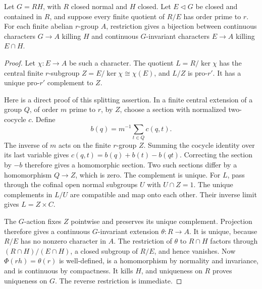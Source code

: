\begin{lemma}
\label{lem:coprime-relative-general}
Let \(G=RH\), with \(R\) closed normal and \(H\) closed.
Let \(E\triangleleft G\) be closed and contained in \(R\), and
suppose every finite quotient of \(R/E\) has order prime to \(r\).
For each finite abelian \(r\)-group \(A\), restriction gives a
bijection between continuous characters \(G\to A\) killing \(H\)
and continuous \(G\)-invariant characters \(E\to A\) killing
\(E\cap H\).
\end{lemma}

\begin{proof}
Let \(\chi:E\to A\) be such a character.
The quotient \(L=R/\ker\chi\) has the central finite
\(r\)-subgroup \(Z=E/\ker\chi\cong\chi(E)\), and \(L/Z\)
is pro-\(r'\).
It has a unique pro-\(r'\) complement to \(Z\).

Here is a direct proof of this splitting assertion.
In a finite central extension of a group \(Q\), of order
\(m\) prime to \(r\), by \(Z\), choose a section with normalized
two-cocycle \(c\). Define
\[
 b(q)=m^{-1}\sum_{t\in Q}c(q,t).
\]
The inverse of \(m\) acts on the finite \(r\)-group \(Z\).
Summing the cocycle identity over its last variable gives
\(c(q,t)=b(q)+b(t)-b(qt)\).
Correcting the section by \(-b\) therefore gives a homomorphic
section. Two such sections differ by a homomorphism \(Q\to Z\),
which is zero. The complement is unique.
For \(L\), pass through the cofinal open normal subgroups
\(U\) with \(U\cap Z=1\).
The unique complements in \(L/U\) are compatible and map onto
each other. Their inverse limit gives \(L=Z\times C\).

The \(G\)-action fixes \(Z\) pointwise and preserves its unique
complement. Projection therefore gives a continuous
\(G\)-invariant extension \(\theta:R\to A\).
It is unique, because \(R/E\) has no nonzero character in \(A\).
The restriction of \(\theta\) to \(R\cap H\) factors through
\((R\cap H)/(E\cap H)\), a closed subgroup of \(R/E\), and
hence vanishes.
Now \(\Phi(rh)=\theta(r)\) is well-defined, is a homomorphism
by normality and invariance, and is continuous by compactness.
It kills \(H\), and uniqueness on \(R\) proves uniqueness on
\(G\). The reverse restriction is immediate.
\end{proof}

